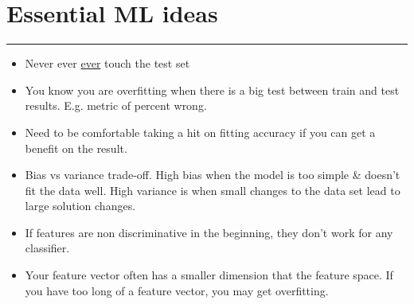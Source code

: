 \section{Essential ML ideas}
\smallskip \hrule height 2pt \smallskip

\begin{itemize}
	\item Never ever \underline{ever} touch the test set
	\item You know you are overfitting when there is a big test between train and test results.  E.g. metric of percent wrong. 
	\item Need to be comfortable taking a hit on fitting accuracy if you can get a benefit on the result.
	\item Bias vs variance trade-off.  
		High bias when the model is too simple \& doesn't fit the data well.  
		High variance is when small changes to the data set lead to large solution changes. 
	\item If features are non discriminative in the beginning, they don't work for any classifier.  %
	\item Your feature vector often has a smaller dimension that the feature space.    %
		If you have too long of a feature vector, you may get overfitting. 

\end{itemize}